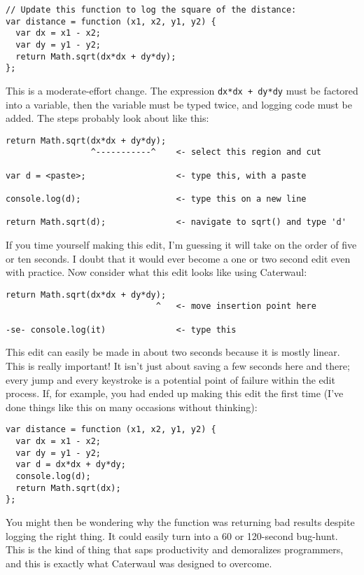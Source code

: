 \documentclass{report}
\begin{document}
\begin{verbatim}
// Update this function to log the square of the distance:
var distance = function (x1, x2, y1, y2) {
  var dx = x1 - x2;
  var dy = y1 - y2;
  return Math.sqrt(dx*dx + dy*dy);
};
\end{verbatim}

    This is a moderate-effort change. The expression {\tt dx*dx + dy*dy} must be factored into a variable, then the variable must be typed twice, and logging code must be added. The steps
    probably look about like this:

\begin{verbatim}
return Math.sqrt(dx*dx + dy*dy);
                 ^-----------^    <- select this region and cut

var d = <paste>;                  <- type this, with a paste

console.log(d);                   <- type this on a new line

return Math.sqrt(d);              <- navigate to sqrt() and type 'd'
\end{verbatim}

    If you time yourself making this edit, I'm guessing it will take on the order of five or ten seconds. I doubt that it would ever become a one or two second edit even with practice. Now
    consider what this edit looks like using Caterwaul:

\begin{verbatim}
return Math.sqrt(dx*dx + dy*dy);
                              ^   <- move insertion point here

-se- console.log(it)              <- type this
\end{verbatim}

    This edit can easily be made in about two seconds because it is mostly linear. This is really important! It isn't just about saving a few seconds here and there; every jump and every
    keystroke is a potential point of failure within the edit process. If, for example, you had ended up making this edit the first time (I've done things like this on many occasions without
    thinking):

\begin{verbatim}
var distance = function (x1, x2, y1, y2) {
  var dx = x1 - x2;
  var dy = y1 - y2;
  var d = dx*dx + dy*dy;
  console.log(d);
  return Math.sqrt(dx);
};
\end{verbatim}

    You might then be wondering why the function was returning bad results despite logging the right thing. It could easily turn into a 60 or 120-second bug-hunt. This is the kind of thing
    that saps productivity and demoralizes programmers, and this is exactly what Caterwaul was designed to overcome.
\end{document}
